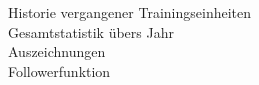 Historie vergangener Trainingseinheiten \\
Gesamtstatistik übers Jahr \\
Auszeichnungen \\
Followerfunktion \\
